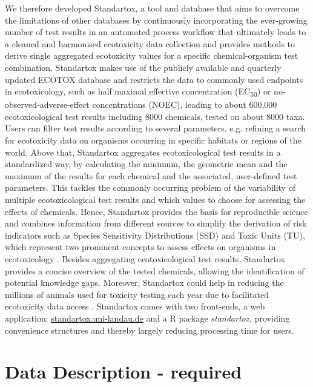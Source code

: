 \documentclass[journal,datadescriptor,accept,moreauthors,pdftex]{Definitions/mdpi}
\begin{document}
We therefore developed Standartox, a tool and database that aims to overcome the limitations of other databases by continuously incorporating the ever-growing number of test results in an automated process workflow that ultimately leads to a cleaned and harmonised ecotoxicity data collection and provides methods to derive single aggregated ecotoxicity values for a specific chemical-organism test combination. Standartox makes use of the publicly available and quarterly updated ECOTOX database \citep{usepa_ecotox_2019} and restricts the data to commonly used endpoints in ecotoxicology, such as half maximal effective concentration (EC\textsubscript{50}) or no-observed-adverse-effect concentrations (NOEC), leading to about 600,000 ecotoxicological test results including 8000 chemicals, tested on about 8000 taxa. Users can filter test results according to several parameters, e.g. refining a search for ecotoxicity data on organisms occurring in specific habitats or regions of the world. Above that, Standartox aggregates ecotoxicological test results in a standardized way, by calculating the minimum, the geometric mean and the maximum of the results for each chemical and the associated, user-defined test parameters. This tackles the commonly occurring problem of the variability of multiple ecotoxicological test results and which values to choose for assessing the effects of chemicals. Hence, Standartox provides the basis for reproducible science and combines information from different sources to simplify the derivation of risk indicators such as Species Sensitivity Distributions (SSD) and Toxic Units (TU), which represent two prominent concepts to assess effects on organisms in ecotoxicology \citep{posthuma_species_2002, kefford_definition_2011, schafer_effects_2011}. Besides aggregating ecotoxicological test results, Standartox provides a concise overview of the tested chemicals, allowing the identification of potential knowledge gaps. Moreover, Standartox could help in reducing the millions of animals used for toxicity testing each year due to facilitated ecotoxicity data access \citep{hartung_chemical_2009}. Standartox comes with two front-ends, a web application: \url{standartox.uni-landau.de} and a R \citep{rcoreteam_language_2017} package \textit{standartox}, providing convenience structures and thereby largely reducing processing time for users.

\section{Data Description - required}
\end{document}
